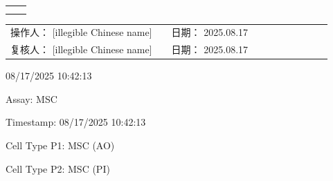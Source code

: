 \documentclass[UTF8,10pt,a4paper,fontset=fandol]{ctexart}
\newcommand{\fieldvalue}[1]{#1}
\newcommand{\handwritten}[1]{#1}
\begin{document}
\vspace{1em}

\noindent
\begin{tabular}{@{}p{0.47\linewidth}p{0.47\linewidth}@{}}
\centering
\fbox{\rule{0pt}{0.19\textheight}\rule{0.92\linewidth}{0pt}}
&
\centering
\fbox{\rule{0pt}{0.19\textheight}\rule{0.92\linewidth}{0pt}}
\\[2em]
\centering
\fbox{\rule{0pt}{0.19\textheight}\rule{0.92\linewidth}{0pt}}
&
\centering
\fbox{\rule{0pt}{0.19\textheight}\rule{0.92\linewidth}{0pt}}
\end{tabular}


\vfill

\noindent
\begin{tabular}{@{}p{0.47\linewidth}p{0.47\linewidth}@{}}
操作人：
\fieldvalue{\handwritten{[illegible Chinese name]}}
&
日期：
\fieldvalue{\handwritten{2025.08.17}}
\\[1.5em]
复核人：
\fieldvalue{\handwritten{[illegible Chinese name]}}
&
日期：
\fieldvalue{\handwritten{2025.08.17}}
\end{tabular}

\newpage

\noindent\ttfamily
\begin{flushright}
08/17/2025 10:42:13
\end{flushright}

\textnormal{Assay: }\fieldvalue{MSC}

\textnormal{Timestamp: }\fieldvalue{08/17/2025 10:42:13}

\vspace{0.5em}

\textnormal{Cell Type P1: }\fieldvalue{MSC (AO)}

\textnormal{Cell Type P2: }\fieldvalue{MSC (PI)}
\end{document}
